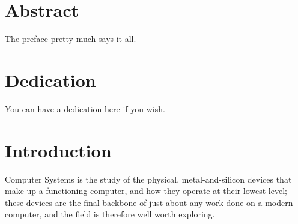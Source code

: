 \documentclass[12pt,twoside]{reedthesis}
\begin{document}
\tableofcontents
\listoftables
\listoffigures

\chapter*{Abstract}
The preface pretty much says it all.

\chapter*{Dedication}
You can have a dedication here if you wish.

\mainmatter %
\pagestyle{fancyplain} %


\chapter*{Introduction}


Computer Systems is the study of the physical, metal-and-silicon devices that make up a functioning computer, and how they operate at their lowest level; these devices are the final backbone of just about any work done on a modern computer, and the field is therefore well worth exploring.
\end{document}
